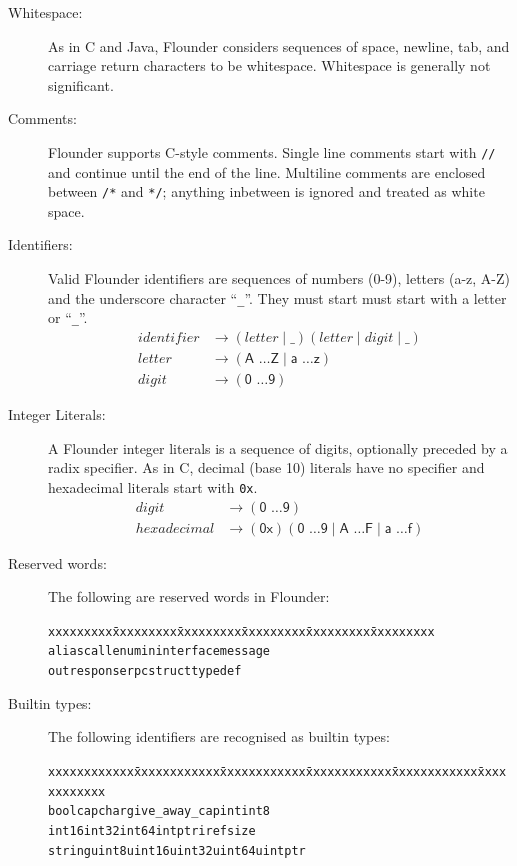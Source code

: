 \documentclass[a4paper,twoside]{report} %
\begin{document}
\begin{description}
\item[Whitespace:]  As in C and Java, Flounder considers sequences of
  space, newline, tab, and carriage return characters to be
  whitespace.  Whitespace is generally not significant. 

\item[Comments:] Flounder supports C-style comments.  Single line comments
  start with \texttt{//} and continue until the end of the line.
  Multiline comments are enclosed between \texttt{/*} and \texttt{*/};
  anything inbetween is ignored and treated as white space.

\item[Identifiers:] Valid Flounder identifiers are sequences of numbers
  (0-9), letters (a-z, A-Z) and the underscore character ``\texttt{\_}''.  They
  must start must start with a letter or ``\texttt{\_}''.  
  \begin{align*}
    identifier & \rightarrow ( letter \mid \_ ) (letter \mid digit \mid \_) \\
    letter & \rightarrow (\textsf{A \ldots Z} \mid  \textsf{a \ldots z})\\
    digit & \rightarrow (\textsf{0 \ldots 9})
\end{align*}
  
\item[Integer Literals:] A Flounder integer literals is a sequence of
  digits, optionally preceded by a radix specifier.  As in C, decimal (base 10)
  literals have no specifier and hexadecimal literals start with
  \texttt{0x}.
\begin{align*}
digit & \rightarrow (\textsf{0 \ldots 9})\\
hexadecimal & \rightarrow (\textsf{0x})(\textsf{0 \ldots 9} \mid \textsf{A
\ldots F} \mid \textsf{a \ldots f})
\end{align*}


\item[Reserved words:] The following are reserved words in Flounder:
\begin{alltt}\begin{tabbing}
xxxxxxxxx \= xxxxxxxxx \= xxxxxxxxx \= xxxxxxxxx \= xxxxxxxxx \= xxxxxxxxx \kill
alias \> call \> enum \> in \> interface \> message \\
out \> response \> rpc \> struct \> typedef 
\end{tabbing}\end{alltt}

\item[Builtin types:] The following identifiers are recognised as builtin types:
\begin{alltt}\begin{tabbing}
xxxxxxxxxxxx \= xxxxxxxxxxxx \= xxxxxxxxxxxx \= xxxxxxxxxxxx \= xxxxxxxxxxxx \=
xxxxxxxxxxxx \kill
bool \> cap \> char \> give_away_cap \> int \> int8 \\
int16 \> int32 \> int64 \> intptr \> iref \> size \\
string \> uint8 \> uint16 \> uint32 \> uint64 \> uintptr
\end{tabbing}\end{alltt}


\end{description}
\end{document}
